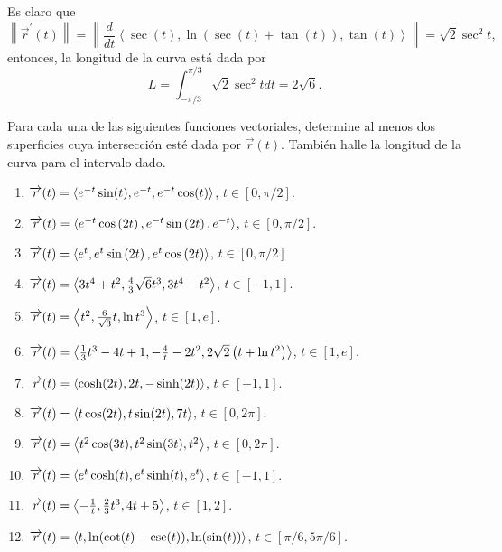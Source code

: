 Es claro que
\[
\left\| \overrightarrow{r}^{\prime }(t)\right\| =\left\| \frac{d}{dt}\left\langle \sec (t) ,\ln \left( \sec (t) +\tan (t) \right) ,\tan (t) \right\rangle \right\| =\sqrt{2}\sec ^{2}t\text{,}
\]
entonces, la longitud de la curva está dada por
$$L=\int_{-\pi /3}^{\pi /3}\sqrt{2}\sec ^{2}tdt= 2\sqrt{6}.$$

\begin{ejer}
\normalfont
Para cada una de las siguientes funciones vectoriales, determine al menos dos
superficies cuya intersección esté dada por $\overrightarrow{r}(t)$.
También halle la longitud de la curva para el intervalo dado.
\begin{enumerate}
\item $ \overrightarrow{r}(t)=\left \langle e^{-t}\sin (t),e^{-t},e^{-t}\cos (t) \right \rangle$, $t \in [0,\pi/2]$.
\item $ \overrightarrow{r}(t)=\left \langle e^{-t}\cos \left( 2t\right),e^{-t}\sin \left( 2t\right),e^{-t} \right \rangle $,
$t \in [0,\pi/2]$.
\item $\overrightarrow{r}(t)=\left \langle e^{t},e^{t}\sin \left(2t\right) ,e^{t}\cos \left( 2t\right) \right \rangle $,
$t \in [0,\pi/2]$
\item $ \overrightarrow{r}(t)=\left \langle 3t^{4}+t^{2},\frac{4}{3}\sqrt{6}t^{3},3t^{4}-t^{2}\right \rangle $,
$t \in [-1,1]$.
\item $ \overrightarrow{r}(t)=\left \langle t^{2},\frac{6}{\sqrt{3}}t,\ln t^{3}\right \rangle $,
$t \in [1,e]$.
\item $\overrightarrow{r}(t) =\left \langle \frac{1}{3}t^{3}-4t+1,-\frac{4}{t}-2t^{2},2\sqrt{2}\left( t+\ln t^{2}\right) \right \rangle $,
$t \in [1,e]$.
\normalfont
\item $\overrightarrow{r}(t) =\left \langle \cosh(2t), 2t, -\sinh(2t) \right \rangle $, $t\in [-1,1]$.
\item $\overrightarrow{r}(t) =\left \langle t \cos (2t),t \sin (2t),7 t \right \rangle $, $t\in [0,2\pi]$.
\item $\overrightarrow{r}(t) =\left \langle t^2\cos (3t),t^2 \sin (3t),t^2 \right \rangle $, $t\in [0,2\pi]$.
\item $\overrightarrow{r}(t) =\left \langle e^t \cosh(t),e^t \sinh(t),e^t \right \rangle $, $t\in [-1,1]$.
\item $\overrightarrow{r}(t) =\left \langle -\frac{1}{t},\frac{2}{3}t^3,4t+5\right \rangle $, $t\in [1,2]$.
\item $\overrightarrow{r}(t) =\left \langle t,\ln (\cot (t)-\csc (t)),\ln(\sin (t)) \right \rangle $, $t\in [\pi/6,5\pi/6]$.

\end{enumerate}
\end{ejer}

